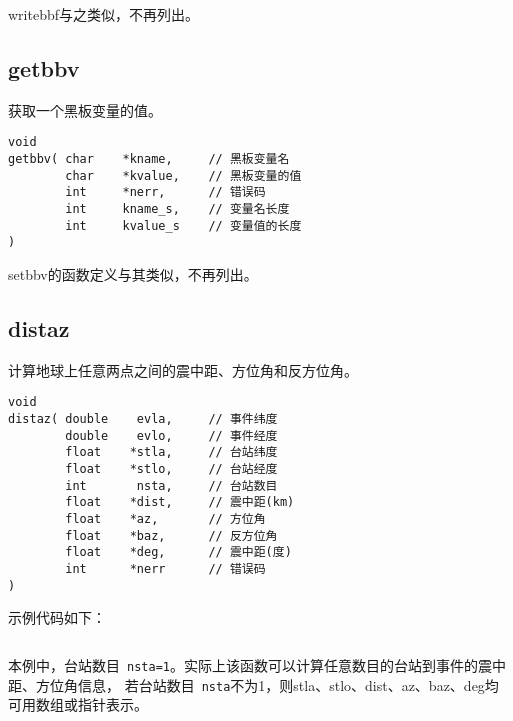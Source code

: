writebbf与之类似，不再列出。

\subsection{getbbv}
获取一个黑板变量的值。
\begin{verbatim}
void
getbbv( char    *kname,     // 黑板变量名
        char    *kvalue,    // 黑板变量的值
        int     *nerr,      // 错误码
        int     kname_s,    // 变量名长度
        int     kvalue_s    // 变量值的长度
)
\end{verbatim}
setbbv的函数定义与其类似，不再列出。

\subsection{distaz}
计算地球上任意两点之间的震中距、方位角和反方位角。
\begin{verbatim}
void
distaz( double    evla,     // 事件纬度
        double    evlo,     // 事件经度
        float    *stla,     // 台站纬度
        float    *stlo,     // 台站经度
        int       nsta,     // 台站数目
        float    *dist,     // 震中距(km)
        float    *az,       // 方位角
        float    *baz,      // 反方位角
        float    *deg,      // 震中距(度)
        int      *nerr      // 错误码
)
\end{verbatim}
示例代码如下：
\inputminted{c}{./libs/distaz.c}
本例中，台站数目~\verb+nsta=1+。实际上该函数可以计算任意数目的台站到事件的震中距、方位角信息，
若台站数目~\verb+nsta+不为1，则stla、stlo、dist、az、baz、deg均可用数组或指针表示。
